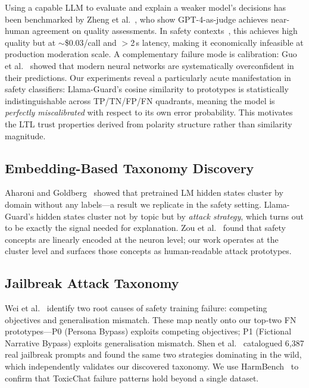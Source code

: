 \documentclass[letterpaper]{article}
\begin{document}
Using a capable LLM to evaluate and explain a weaker model's decisions has been benchmarked
by Zheng et al.~\cite{zheng2023judging}, who show GPT-4-as-judge achieves near-human
agreement on quality assessments. In safety contexts~\cite{dasantar2025aies}, this achieves
high quality but at $\sim$\$0.03/call and $>$2\,s latency, making it economically infeasible
at production moderation scale. A complementary failure mode is calibration: Guo et
al.~\cite{guo2017calibration} showed that modern neural networks are systematically
overconfident in their predictions. Our experiments reveal a particularly acute
manifestation in safety classifiers: Llama-Guard's cosine similarity to prototypes is
statistically indistinguishable across TP/TN/FP/FN quadrants, meaning the model is
\emph{perfectly miscalibrated} with respect to its own error probability. This motivates
the LTL trust properties derived from polarity structure rather than similarity magnitude.

\subsection{Embedding-Based Taxonomy Discovery}

Aharoni and Goldberg~\cite{aharoni2020unsupervised} showed that pretrained LM hidden
states cluster by domain without any labels---a result we replicate in the safety setting.
Llama-Guard's hidden states cluster not by topic but by \emph{attack strategy}, which
turns out to be exactly the signal needed for explanation. Zou et al.~\cite{zou2023universal}
found that safety concepts are linearly encoded at the neuron level; our work operates
at the cluster level and surfaces those concepts as human-readable attack prototypes.

\subsection{Jailbreak Attack Taxonomy}

Wei et al.~\cite{wei2023jailbroken} identify two root causes of safety training failure:
competing objectives and generalisation mismatch. These map neatly onto our top-two
FN prototypes---P0 (Persona Bypass) exploits competing objectives; P1 (Fictional Narrative
Bypass) exploits generalisation mismatch. Shen et al.~\cite{shen2024dan} catalogued 6,387
real jailbreak prompts and found the same two strategies dominating in the wild, which
independently validates our discovered taxonomy. We use HarmBench~\cite{mazeika2024harmbench}
to confirm that ToxicChat failure patterns hold beyond a single dataset.
\end{document}
